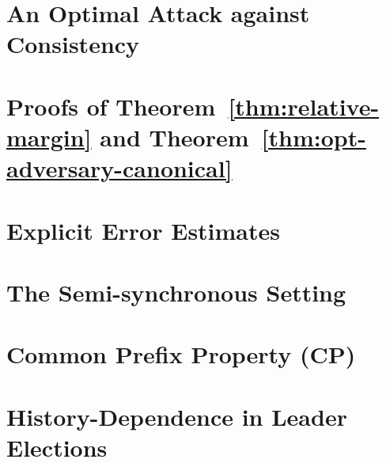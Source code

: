 \chapter{An Optimal Attack against Consistency}\label{sec:opt-adversary}


\chapter{Proofs of Theorem~\ref{thm:relative-margin} and Theorem~\ref{thm:opt-adversary-canonical}}\label{sec:margin-proof-multihonest}


\chapter{Explicit Error Estimates}\label{sec:exact-prob-multihonest}



\chapter{The Semi-synchronous Setting}\label{sec:async-multihonest}\label{sec:async-model-multihonest}



\chapter{Common Prefix Property (CP)}\label{sec:cp-multihonest}\label{sec:cp-model-multihonest}



\chapter{History-Dependence in Leader Elections}

